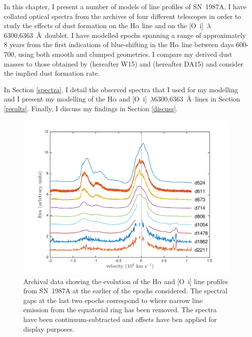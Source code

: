 In this chapter, I present a number of models of line profiles of SN~1987A. I have collated optical spectra from the archives of four different telescopes in order to study the effects of dust formation on 
the H$\alpha$ line and on the [O~{\sc i}]~$\lambda$6300,6363~\AA\ doublet.  
I have modelled epochs spanning a range of approximately 8 years from the first 
indications of blue-shifting in the H$\alpha$ line between days 600-700, using 
both smooth and clumped geometries.  I compare my derived dust masses to 
those obtained by \citet{Wesson2015} (hereafter W15) and \citet{Dwek2015} (hereafter DA15) and consider the implied dust formation rate. 

In Section \ref{spectra}, I detail the observed spectra that I used for 
my modelling and I present my modelling of the 
H$\alpha$ and [O~{\sc i}]~$\lambda$6300,6363~\AA\ lines in 
Section \ref{results}.  Finally, I discuss my findings in Section 
\ref{discuss}.
    

\begin{figure}
\centering
\includegraphics[trim =39 10 45 15,clip=true,scale=0.8]{chapters/chapter5/images/Ha_evol_early_1col2.pdf}
\caption{Archival data showing the evolution of the H$\alpha$ and
[O~{\sc i}] line profiles from SN~1987A at the earlier of the epochs considered. The 
spectral gaps at the last two epochs correspond to where narrow line 
emission from the equatorial ring has been removed. The spectra have been
continuum-subtracted and offsets have ben applied for display purposes.}
\label{Ha_evol_early}
\end{figure}


